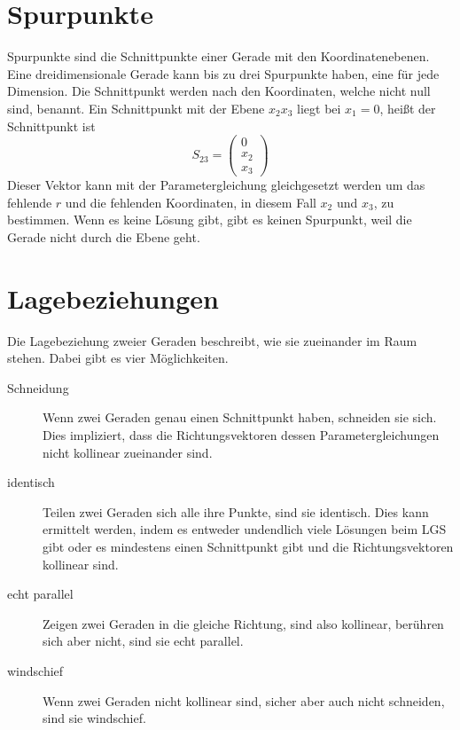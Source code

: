 \documentclass{article}
\begin{document}
\section{Spurpunkte}
Spurpunkte sind die Schnittpunkte einer Gerade mit den Koordinatenebenen.
Eine dreidimensionale Gerade kann bis zu drei Spurpunkte haben, eine für jede Dimension. Die Schnittpunkt werden nach den Koordinaten, welche nicht null sind, benannt. \newline
Ein Schnittpunkt mit der Ebene $x_2x_3$ liegt bei $x_1 = 0$, heißt der Schnittpunkt ist
\[
 S_{23} = \begin{pmatrix} 0 \\ x_2 \\ x_3 \end{pmatrix} 
\]
Dieser Vektor kann mit der Parametergleichung gleichgesetzt werden um das fehlende $r$ und die fehlenden Koordinaten, in diesem Fall $x_2$ und $x_3$, zu bestimmen. Wenn es keine Lösung gibt, gibt es keinen Spurpunkt, weil die Gerade nicht durch die Ebene geht.
 
\section{Lagebeziehungen}
Die Lagebeziehung zweier Geraden beschreibt, wie sie zueinander im Raum stehen. Dabei gibt es vier Möglichkeiten.
\begin{description}
 \item[Schneidung] Wenn zwei Geraden genau einen Schnittpunkt haben, schneiden sie sich. Dies impliziert, dass die Richtungsvektoren dessen Parametergleichungen nicht kollinear zueinander sind.
 \item[identisch] Teilen zwei Geraden sich alle ihre Punkte, sind sie identisch. Dies kann ermittelt werden, indem es entweder undendlich viele Lösungen beim LGS gibt oder es mindestens einen Schnittpunkt gibt und die Richtungsvektoren kollinear sind.
 \item[echt parallel] Zeigen zwei Geraden in die gleiche Richtung, sind also kollinear, berühren sich aber nicht, sind sie echt parallel.
 \item[windschief] Wenn zwei Geraden nicht kollinear sind, sicher aber auch nicht schneiden, sind sie windschief.
\end{description} 
 
\end{document}
